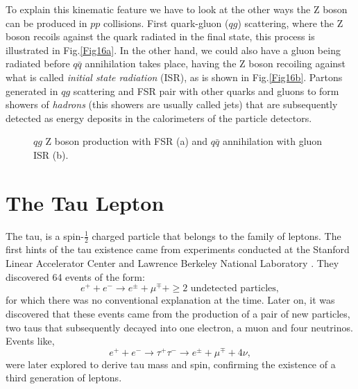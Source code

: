 To explain this kinematic feature we have to look at the other ways the Z boson can be produced in $pp$ collisions. First quark-gluon ($qg$) scattering, where the Z boson recoils against the quark radiated in the final state, this process is illustrated in Fig.\ref{Fig16a}. In the other hand, we could also have a gluon being radiated before $q\bar{q}$ annihilation takes place, having the Z boson recoiling against what is called \textit{initial state radiation} (ISR), as is shown in Fig.\ref{Fig16b}. Partons generated in $qg$ scattering and FSR pair with other quarks and gluons to form showers of \textit{hadrons} (this showers are usually called jets) that are subsequently detected as energy deposits in the calorimeters of the particle detectors. 
\begin{figure}[ht]
	\centering
	\hfill
	\caption{$qg$ Z boson production with FSR (a) and $q\bar{q}$ annihilation with gluon ISR (b).}
	\label{Fig16}
\end{figure}
\section{The Tau Lepton}\label{chap2sec1}
The tau, is a spin-$\frac{1}{2}$ charged particle that belongs to the family of leptons. The first hints of the tau existence came from experiments conducted at the Stanford Linear Accelerator Center and Lawrence Berkeley National Laboratory \cite{PhysRevLett.35.1489}. They discovered 64 events of the form:
\begin{equation}
	e^+ + e^- \to e^\pm + \mu^\mp + \geq \text{2 undetected particles},
\end{equation}
for which there was no conventional explanation at the time. Later on, it was discovered that these events came from the production of a pair of new particles, two taus that subsequently decayed into one electron, a muon and four neutrinos. Events like,
\begin{equation}
e^+ + e^- \to \tau^+ \tau^- \to e^\pm + \mu^\mp + 4\nu,
\end{equation}	
were later explored to derive tau mass and spin, confirming the existence of a third generation of leptons. 

